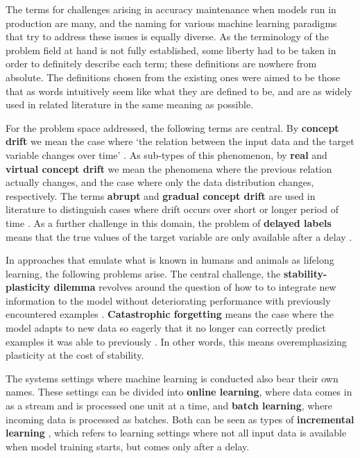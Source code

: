 

The terms for challenges arising in accuracy maintenance when models run in production are many, and the naming for various machine learning paradigms that try to address these issues is equally diverse. As the terminology of the problem field at hand is not fully established, some liberty had to be taken in order to definitely describe each term; these definitions are nowhere from absolute. The definitions chosen from the existing ones were aimed to be those that as words intuitively seem like what they are defined to be, and are as widely used in related literature in the same meaning as possible. 

For the problem space addressed, the following terms are central. By \textbf{concept drift} we mean the case where `the relation between the input
data and the target variable changes over time' \cite{conceptdriftsurvey}. As sub-types of this phenomenon, by \textbf{real} and \textbf{virtual concept drift} we mean the phenomena where the previous relation actually changes, and the case where only the data distribution changes, respectively. The terms \textbf{abrupt} and \textbf{gradual concept drift} are used in literature to distinguish cases where drift occurs over short or longer period of time \cite{zliobaite_driftsurvey}. As a further challenge in this domain, the problem of \textbf{delayed labels} means that the true values of the target variable are only available after a delay \cite{delayedlabelstreams}.

In approaches that emulate what is known in humans and animals as lifelong learning, the following problems arise. The central challenge, the \textbf{stability-plasticity dilemma} revolves around the question of how to to integrate new information to the model without deteriorating performance with previously encountered examples \cite{lmlinneuralnets}. \textbf{Catastrophic forgetting} means the case where the model adapts to new data so eagerly that it no longer can correctly predict examples it was able to previously \cite{lmlinneuralnets}. In other words, this means overemphasizing plasticity at the cost of stability.

The systems settings where machine learning is conducted also bear their own names. These settings can be divided into \textbf{online learning}, where data comes in as a stream and is processed one unit at a time, and \textbf{batch learning}, where incoming data is processed as batches. Both can be seen as types of \textbf{incremental learning} \cite{giraud-carrier_note_2000}, which refers to learning settings where not all input data is available when model training starts, but comes only after a delay.

